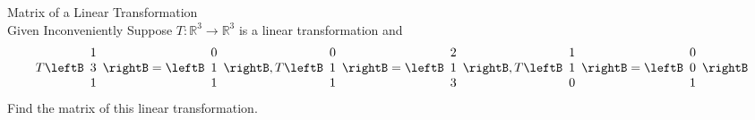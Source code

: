 \begin{example}{Matrix of a Linear Transformation \\ Given Inconveniently}\label{exa:inconvenientmatrixlintransf}
Suppose $T:\mathbb{R}^{3}\rightarrow \mathbb{R}^{3}$ is a linear
transformation and
\begin{equation*}
T\leftB
\begin{array}{r}
1 \\
3 \\
1
\end{array}
\rightB =\leftB
\begin{array}{r}
0 \\
1 \\
1
\end{array}
\rightB ,T\leftB
\begin{array}{r}
0 \\
1 \\
1
\end{array}
\rightB =\leftB
\begin{array}{r}
2 \\
1 \\
3
\end{array}
\rightB ,T\leftB
\begin{array}{r}
1 \\
1 \\
0
\end{array}
\rightB =\leftB
\begin{array}{r}
0 \\
0 \\
1
\end{array}
\rightB
\end{equation*}
Find the matrix of this linear transformation.
\end{example}

